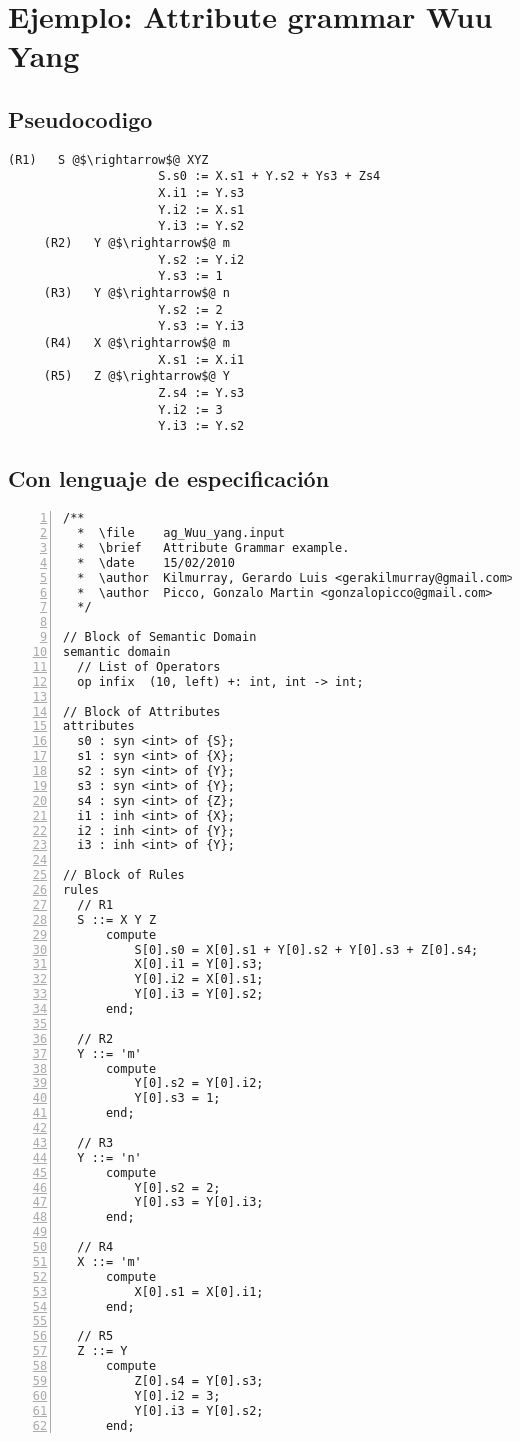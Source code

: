 \section{Ejemplo: Attribute grammar Wuu Yang}
\label{append:agwuuyang}
\scriptsize
\subsection{Pseudocodigo}
\begin{lstlisting}[escapeinside=@@, backgroundcolor=\color{white}]
     (R1)   S @$\rightarrow$@ XYZ      
                     S.s0 := X.s1 + Y.s2 + Ys3 + Zs4
                     X.i1 := Y.s3  
                     Y.i2 := X.s1
                     Y.i3 := Y.s2
     (R2)   Y @$\rightarrow$@ m        
                     Y.s2 := Y.i2
                     Y.s3 := 1
     (R3)   Y @$\rightarrow$@ n        
                     Y.s2 := 2
                     Y.s3 := Y.i3
     (R4)   X @$\rightarrow$@ m        
                     X.s1 := X.i1
     (R5)   Z @$\rightarrow$@ Y        
                     Z.s4 := Y.s3
                     Y.i2 := 3
                     Y.i3 := Y.s2
\end{lstlisting} 

\subsection{Con lenguaje de especificación}
\scriptsize
\begin{lstlisting}[numbers=left, numberstyle=\tiny, numbersep=5pt, language=cobol ]
/**
  *  \file    ag_Wuu_yang.input
  *  \brief   Attribute Grammar example.
  *  \date    15/02/2010
  *  \author  Kilmurray, Gerardo Luis <gerakilmurray@gmail.com>
  *  \author  Picco, Gonzalo Martin <gonzalopicco@gmail.com>
  */

// Block of Semantic Domain
semantic domain
  // List of Operators 
  op infix  (10, left) +: int, int -> int;

// Block of Attributes
attributes
  s0 : syn <int> of {S};
  s1 : syn <int> of {X};
  s2 : syn <int> of {Y};
  s3 : syn <int> of {Y};
  s4 : syn <int> of {Z};
  i1 : inh <int> of {X};
  i2 : inh <int> of {Y};
  i3 : inh <int> of {Y};

// Block of Rules
rules
  // R1
  S ::= X Y Z
      compute  
          S[0].s0 = X[0].s1 + Y[0].s2 + Y[0].s3 + Z[0].s4;
          X[0].i1 = Y[0].s3;
          Y[0].i2 = X[0].s1;
          Y[0].i3 = Y[0].s2;
      end;

  // R2
  Y ::= 'm'
      compute
          Y[0].s2 = Y[0].i2;
          Y[0].s3 = 1;
      end;

  // R3
  Y ::= 'n'
      compute
          Y[0].s2 = 2;
          Y[0].s3 = Y[0].i3;
      end;

  // R4
  X ::= 'm'
      compute
          X[0].s1 = X[0].i1;
      end;
  
  // R5
  Z ::= Y
      compute
          Z[0].s4 = Y[0].s3;
          Y[0].i2 = 3;
          Y[0].i3 = Y[0].s2;
      end;           
\end{lstlisting}
